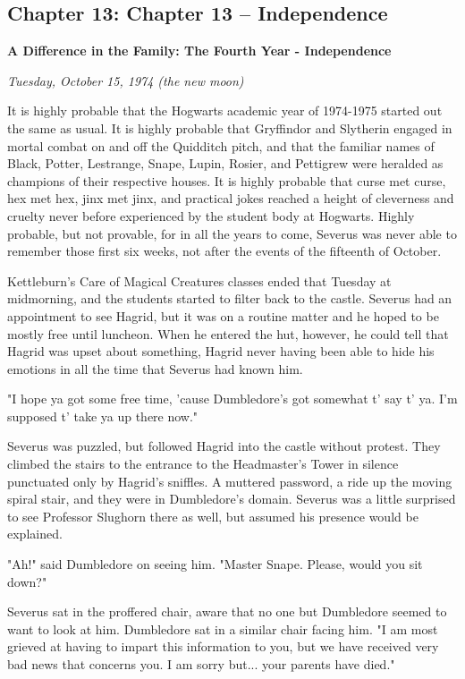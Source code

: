\documentclass[a4paper,11pt]{article}
\begin{document}
\subsection{Chapter 13: Chapter 13 – Independence}

\textbf{A Difference in the Family: The Fourth Year - Independence}

\emph{Tuesday, October 15, 1974 (the new moon)}

It is highly probable that the Hogwarts academic year of 1974-1975 started out the same as usual. It is highly probable that Gryffindor and Slytherin engaged in mortal combat on and off the Quidditch pitch, and that the familiar names of Black, Potter, Lestrange, Snape, Lupin, Rosier, and Pettigrew were heralded as champions of their respective houses. It is highly probable that curse met curse, hex met hex, jinx met jinx, and practical jokes reached a height of cleverness and cruelty never before experienced by the student body at Hogwarts. Highly probable, but not provable, for in all the years to come, Severus was never able to remember those first six weeks, not after the events of the fifteenth of October.

Kettleburn's Care of Magical Creatures classes ended that Tuesday at midmorning, and the students started to filter back to the castle. Severus had an appointment to see Hagrid, but it was on a routine matter and he hoped to be mostly free until luncheon. When he entered the hut, however, he could tell that Hagrid was upset about something, Hagrid never having been able to hide his emotions in all the time that Severus had known him.

"I hope ya got some free time, 'cause Dumbledore's got somewhat t' say t' ya. I'm supposed t' take ya up there now."

Severus was puzzled, but followed Hagrid into the castle without protest. They climbed the stairs to the entrance to the Headmaster's Tower in silence punctuated only by Hagrid's sniffles. A muttered password, a ride up the moving spiral stair, and they were in Dumbledore's domain. Severus was a little surprised to see Professor Slughorn there as well, but assumed his presence would be explained.

"Ah!" said Dumbledore on seeing him. "Master Snape. Please, would you sit down?"

Severus sat in the proffered chair, aware that no one but Dumbledore seemed to want to look at him. Dumbledore sat in a similar chair facing him. "I am most grieved at having to impart this information to you, but we have received very bad news that concerns you. I am sorry but... your parents have died."
\end{document}
